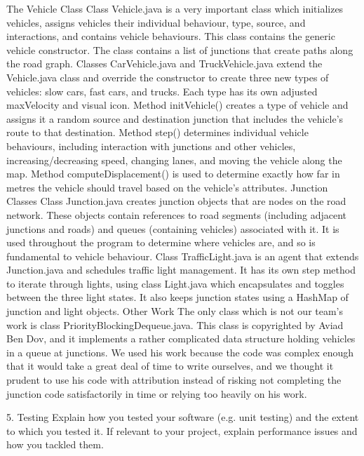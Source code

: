 \documentclass[11pt]{article}
\begin{document}
The Vehicle Class
Class Vehicle.java is a very important class which initializes vehicles, assigns vehicles their individual behaviour, type, source, and interactions, and contains vehicle behaviours. This class contains the generic vehicle constructor. The class contains a list of junctions that create paths along the road graph. 
Classes CarVehicle.java and TruckVehicle.java extend the Vehicle.java class and override the constructor to create three new types of vehicles: slow cars, fast cars, and trucks. Each type has its own adjusted maxVelocity and visual icon. 
Method initVehicle() creates a type of vehicle and assigns it a random source and destination junction that includes the vehicle’s route to that destination. 
Method step() determines individual vehicle behaviours, including interaction with junctions and other vehicles, increasing/decreasing speed, changing lanes, and moving the vehicle along the map. 
Method computeDisplacement() is used to determine exactly how far in metres the vehicle should travel based on the vehicle’s attributes. 
Junction Classes
Class Junction.java creates junction objects that are nodes on the road network. These objects contain references to road segments (including adjacent junctions and roads) and queues (containing vehicles) associated with it. It is used throughout the program to determine where vehicles are, and so is fundamental to vehicle behaviour.
Class TrafficLight.java is an agent that extends Junction.java and schedules traffic light management. It has its own step method to iterate through lights, using class Light.java which encapsulates and toggles between the three light states. It also keeps junction states using a HashMap of junction and light objects. 
Other Work
The only class which is not our team’s work is class PriorityBlockingDequeue.java. This class is copyrighted by Aviad Ben Dov, and it implements a rather complicated data structure holding vehicles in a queue at junctions. We used his work because the code was complex enough that it would take a great deal of time to write ourselves, and we thought it prudent to use his code with attribution instead of risking not completing the junction code satisfactorily in time or relying too heavily on his work.

5. Testing Explain how you tested your software (e.g. unit testing) and the extent to which you tested it. If relevant to your project, explain performance issues and how you tackled them.
\end{document}
